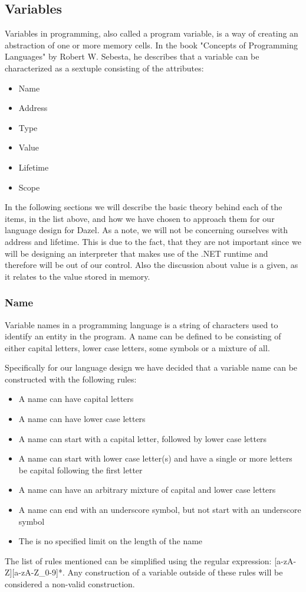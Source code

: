 \subsection{Variables}

Variables in programming, also called a program variable, is a way of creating an abstraction of one or more memory cells. In the book "Concepts of Programming Languages" by
Robert W. Sebesta\cite{sebesta_concepts_2016}, he describes that a variable can be characterized as a sextuple consisting of the attributes:

\begin{itemize}
    \item Name
    \item Address
    \item Type
    \item Value
    \item Lifetime
    \item Scope
\end{itemize}

In the following sections we will describe the basic theory behind each of the items, in the list above, and how we have chosen to approach them for our language design for Dazel.
As a note, we will not be concerning ourselves with address and lifetime. This is due to the fact, that they are not important since we will be designing an interpreter that makes use of the .NET runtime
and therefore will be out of our control. 
Also the discussion about value is a given, as it relates to the value stored in memory\cite{sebesta_concepts_2016}.


\subsubsection{Name}

Variable names in a programming language is a string of characters used to identify an entity in the program\cite{sebesta_concepts_2016}. A name can be defined to be consisting of either capital letters,
lower case letters, some symbols or a mixture of all.

Specifically for our language design we have decided that a variable name can be constructed with the following rules:

\begin{itemize}
    \item A name can have capital letters
    \item A name can have lower case letters
    \item A name can start with a capital letter, followed by lower case letters
    \item A name can start with lower case letter(s) and have a single or more letters be capital following the first letter
    \item A name can have an arbitrary mixture of capital and lower case letters
    \item A name can end with an underscore symbol, but not start with an underscore symbol
    \item The is no specified limit on the length of the name
\end{itemize}

The list of rules mentioned can be simplified using the regular expression: [a-zA-Z][a-zA-Z\_0-9]*. Any construction of a variable outside of these rules will be considered
a non-valid construction.